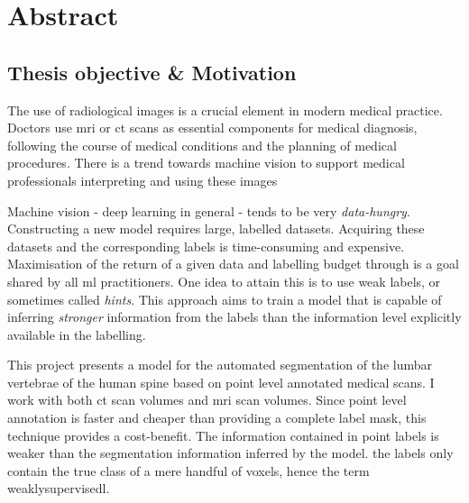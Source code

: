 \chapter*{Abstract}
\begin{multicols}{2}
\section*{Thesis objective \& Motivation}
\par{
    The use of radiological images is a crucial element in modern medical practice. 
    Doctors use \acrfull{mri} or \acrfull{ct} scans as essential components for medical diagnosis, following the course of medical conditions and the planning of medical procedures.
There is a trend towards machine vision to support medical professionals interpreting and using these images 
}
\par{
    Machine vision - deep learning in general - tends to be very \textit{data-hungry}. Constructing a new model requires large, labelled datasets.
    Acquiring these datasets and the corresponding labels is time-consuming and expensive. 
    Maximisation of the return of a given data and labelling budget through is a goal shared by all \acrshort{ml} practitioners.
    One idea to attain this is to use weak labels, or sometimes called \textit{hints}.
    This approach aims to train a model that is capable of inferring \textit{stronger} information from the labels than the information level explicitly available in the labelling.
}
\par{
    This project presents a model for the automated segmentation of the lumbar vertebrae of the human spine based on point level annotated medical scans.
    I work with both \acrshort{ct} scan volumes and \acrshort{mri} scan volumes.
    Since point level annotation is faster and cheaper than providing a complete label mask, this technique provides a cost-benefit. 
    The information contained in point labels is weaker than the segmentation information inferred by the model. the labels only contain the true class of a mere handful of voxels, hence the term \gls{weaklysupervisedl}. 
}




\end{multicols}
